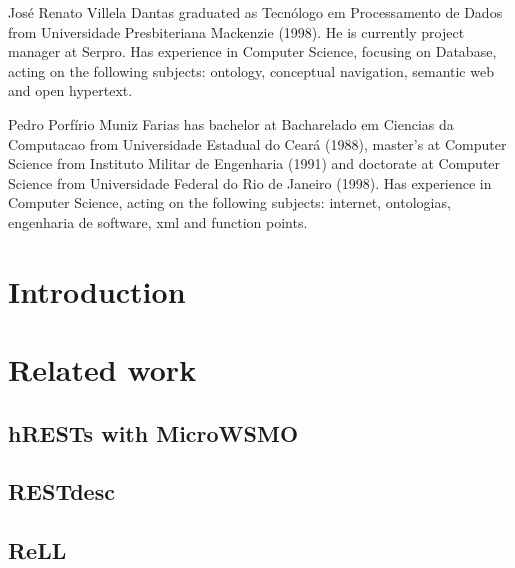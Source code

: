 \documentclass{singlecol-new}
\theoremstyle{TH}{
\newtheorem{lemma}{Lemma}
\newtheorem{theorem}[lemma]{Theorem}
\newtheorem{corrolary}[lemma]{Corrolary}
\newtheorem{conjecture}[lemma]{Conjecture}
\newtheorem{proposition}[lemma]{Proposition}
\newtheorem{claim}[lemma]{Claim}
\newtheorem{stheorem}[lemma]{Wrong Theorem}
\newtheorem{algorithm}{Algorithm}
}
\theoremstyle{THrm}{
\newtheorem{definition}{Definition}[section]
\newtheorem{question}{Question}[section]
\newtheorem{remark}{Remark}
\newtheorem{scheme}{Scheme}
}
\theoremstyle{THhit}{
\newtheorem{case}{Case}[section]
}
\begin{document}

\begin{bio}
	Jos\'{e} Renato Villela Dantas graduated as Tecnólogo em Processamento de Dados from Universidade Presbiteriana Mackenzie (1998). He is currently project manager at Serpro. Has experience in Computer Science, focusing on Database, acting on the following subjects: ontology, conceptual navigation, semantic web and open hypertext.
	
	\noindent Pedro Porf\'{i}rio Muniz Farias has bachelor at Bacharelado em Ciencias da Computacao from Universidade Estadual do Ceará (1988), master's at Computer Science from Instituto Militar de Engenharia (1991) and doctorate at Computer Science from Universidade Federal do Rio de Janeiro (1998). Has experience in Computer Science, acting on the following subjects: internet, ontologias, engenharia de software, xml and function points.
\end{bio}


\maketitle

\section{Introduction} 
\label{sec:introduction}

\section{Related work} 
\label{sec:relatedwork}

\subsection{hRESTs with MicroWSMO}
\label{sec:hrests}

\subsection{RESTdesc}
\label{sec:restdesc}

\subsection{ReLL}
\label{sec:rell}
\end{document}
